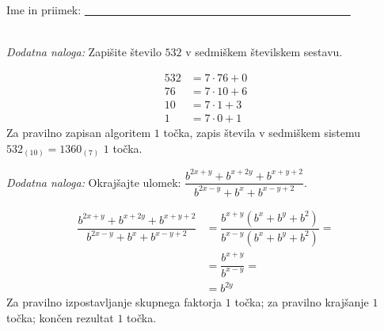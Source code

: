\documentclass[addpoints]{exam}
\begin{document}
\begin{questions}
\begin{parts}
    
        \end{parts}








     \newpage

     \noindent Ime in priimek: \underline{~~~~~~~~~~~~~~~~~~~~~~~~~~~~~~~~~~~~~~~~~~~~~~~~}

     ~\\

    \bonusquestion[2]
    \textit{Dodatna naloga:} Zapišite število $532$ v sedmiškem številskem sestavu.

    \begin{solution}[7cm]
        \begin{align*}
            532 &= 7\cdot 76 + 0 \\
            76 &= 7\cdot 10 + 6 \\
            10 &= 7\cdot 1 + 3 \\
            1 &= 7\cdot 0 + 1
        \end{align*}
        Za pravilno zapisan algoritem $1$ točka, zapis števila v sedmiškem sistemu $532_{(10)}=1360_{(7)}$ $1$ točka.
    \end{solution}




        

    \bonusquestion[3]
    \textit{Dodatna naloga:} Okrajšajte ulomek: $\dfrac{b^{2x+y}+b^{x+2y}+b^{x+y+2}}{b^{2x-y}+b^x+b^{x-y+2}}$.

    \begin{solution}[7cm]
        \begin{align*}
            \dfrac{b^{2x+y}+b^{x+2y}+b^{x+y+2}}{b^{2x-y}+b^x+b^{x-y+2}} &= \dfrac{b^{x+y}(b^x+b^y+b^2)}{b^{x-y}(b^x+b^y+b^2)}= \\
                                                                        &= \dfrac{b^{x+y}}{b^{x-y}}= \\
                                                                        &= b^{2y}
        \end{align*}
        Za pravilno izpostavljanje skupnega faktorja $1$ točka; za pravilno krajšanje $1$ točka; končen rezultat $1$ točka.
    \end{solution}




\end{questions}
\end{document}
